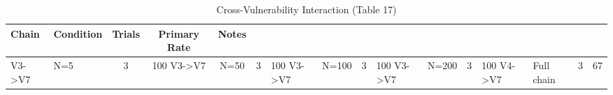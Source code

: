 \begin{table}[htbp]
\centering
\caption{Cross-Vulnerability Interaction (Table 17)}
\begin{tabular}{llccc}
\toprule
Chain & Condition & Trials & Primary Rate & Notes \\
\midrule
V3->V7 & N=5 & 3 & 100%
V3->V7 & N=50 & 3 & 100%
V3->V7 & N=100 & 3 & 100%
V3->V7 & N=200 & 3 & 100%
V4->V7 & Full chain & 3 & 67%
\bottomrule
\end{tabular}
\end{table}
